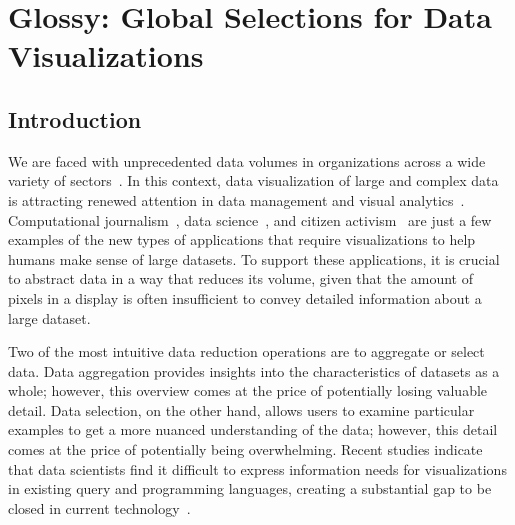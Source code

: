 \documentclass[11pt, oneside]{report}
\begin{document}
{%


\chapter{Glossy: Global Selections for Data Visualizations}
\label{chapter:glossy}
\lstset{
  language=sql
}


\section{Introduction}
\label{sec:glossy:introduction}

We are faced with unprecedented data volumes in organizations across a wide variety of sectors~\cite{MCB+11:McKinsey}. In this context, data visualization of large and complex data is attracting renewed attention in data management and visual analytics~\cite{FeketeS12:DMVisChallenges,hanrahan:enthusiast,wu:case}. Computational journalism~\cite{CohenHT:2011:CompJournalism}, data science~\cite{KandelPHH12:InterviewStudy}, and citizen activism~\cite{ViegasM:2009:ManyEyes} are just a few examples of the new types of applications that require visualizations to help humans make sense of large datasets. To support these applications, it is crucial to abstract data in a way that reduces its volume, given that the amount of pixels in a display is often insufficient to convey detailed information about a large dataset.

Two of the most intuitive data reduction operations are to aggregate or select data. Data aggregation provides insights into the characteristics of datasets as a whole; however, this overview comes at the price of potentially losing valuable detail. Data selection, on the other hand, allows users to examine particular examples to get a more nuanced understanding of the data; however, this detail comes at the price of potentially being overwhelming. Recent studies indicate that data scientists find it difficult to express information needs for visualizations in existing query and programming languages, creating a substantial gap to be closed in current technology~\cite{KandelPHH12:InterviewStudy}.
 
}
\end{document}

